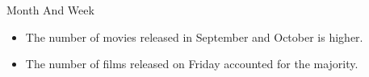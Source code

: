\documentclass[
 size=12pt,
 paper=smartboard,  %
 mode=present, 		%
 display=slides, 	%
 style=tuliplab,  	%
 pauseslide,
 fleqn,leqno]{powerdot}
\begin{document}
\begin{slide}{Month And Week}
  \begin{itemize}
    \item
    The number of movies released in September and October is higher. 
    \item
    The number of films released on Friday accounted for the majority. 
  \end{itemize}
  \vspace{2cm}
\end{slide}
\end{document}
